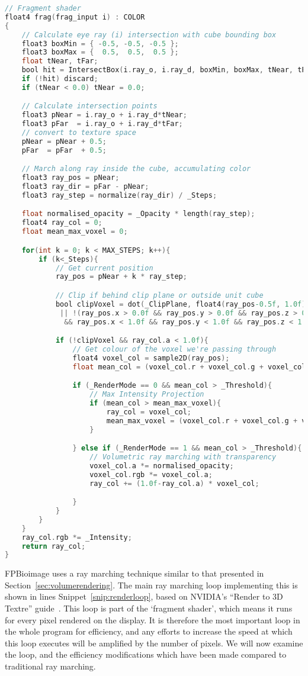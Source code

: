 \begin{lstlisting}[language=C,caption={Fragment shader code for volumetric ray marching},label={snip:renderloop},frame=single]
// Fragment shader
float4 frag(frag_input i) : COLOR
{
	// Calculate eye ray (i) intersection with cube bounding box
	float3 boxMin = { -0.5, -0.5, -0.5 };
	float3 boxMax = {  0.5,  0.5,  0.5 };
	float tNear, tFar;
	bool hit = IntersectBox(i.ray_o, i.ray_d, boxMin, boxMax, tNear, tFar);
	if (!hit) discard;
	if (tNear < 0.0) tNear = 0.0;

	// Calculate intersection points
	float3 pNear = i.ray_o + i.ray_d*tNear;
	float3 pFar  = i.ray_o + i.ray_d*tFar;
	// convert to texture space
	pNear = pNear + 0.5;
	pFar  = pFar  + 0.5;

	// March along ray inside the cube, accumulating color
	float3 ray_pos = pNear;
	float3 ray_dir = pFar - pNear;
	float3 ray_step = normalize(ray_dir) / _Steps;

	float normalised_opacity = _Opacity * length(ray_step);
	float4 ray_col = 0;
	float mean_max_voxel = 0;

	for(int k = 0; k < MAX_STEPS; k++){
		if (k<_Steps){
			// Get current position
			ray_pos = pNear + k * ray_step;

			// Clip if behind clip plane or outside unit cube
			bool clipVoxel = dot(_ClipPlane, float4(ray_pos-0.5f, 1.0f)) > 0.0f
			 || !(ray_pos.x > 0.0f && ray_pos.y > 0.0f && ray_pos.z > 0.0f
			  && ray_pos.x < 1.0f && ray_pos.y < 1.0f && ray_pos.z < 1.0f);

			if (!clipVoxel && ray_col.a < 1.0f){
			  	// Get colour of the voxel we're passing through
		  		float4 voxel_col = sample2D(ray_pos);
			  	float mean_col = (voxel_col.r + voxel_col.g + voxel_col.b);

			  	if (_RenderMode == 0 && mean_col > _Threshold){
			  		// Max Intensity Projection
		  			if (mean_col > mean_max_voxel){
		  				ray_col = voxel_col;
		  				mean_max_voxel = (voxel_col.r + voxel_col.g + voxel_col.b);
		  			}

			  	} else if (_RenderMode == 1 && mean_col > _Threshold){
					// Volumetric ray marching with transparency
					voxel_col.a *= normalised_opacity;
					voxel_col.rgb *= voxel_col.a;
					ray_col += (1.0f-ray_col.a) * voxel_col;

				}
			}
		}
	}
	ray_col.rgb *= _Intensity;
    return ray_col;
}
\end{lstlisting}

FPBioimage uses a ray marching technique similar to that presented in Section~\ref{sec:volumerendering}.
The main ray marching loop implementing this is shown in lines Snippet~\ref{snip:renderloop}, based on NVIDIA's ``Render to 3D Textre'' guide~\cite{nvidia2008guide}.
This loop is part of the `fragment shader', which means it runs for every pixel rendered on the display.
It is therefore the most important loop in the whole program for efficiency, and any efforts to increase the speed at which this loop executes will be amplified by the number of pixels.
We will now examine the loop, and the efficiency modifications which have been made compared to traditional ray marching.


